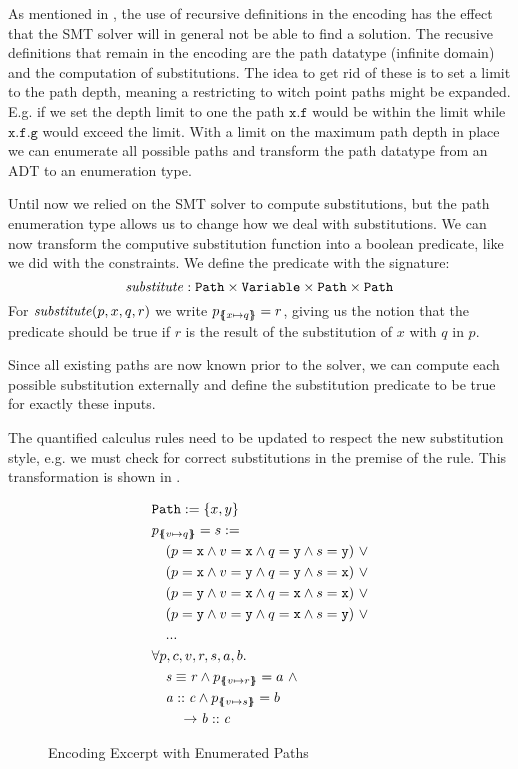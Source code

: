 \documentclass[a4paper]{article}
\begin{document}
As mentioned in , the use of recursive definitions in the encoding has
the effect that the SMT solver will in general not be able to find a solution.
The recusive definitions that remain in the encoding are the path datatype (infinite domain)
and the computation of substitutions.
The idea to get rid of these is to set a limit to the path depth,
meaning a restricting to witch point paths might be expanded.
E.g. if we set the depth limit to one the path $\mathtt{x.f}$ would be within the limit while
$\mathtt{x.f.g}$ would exceed the limit.
With a limit on the maximum path depth in place we can enumerate all possible paths
and transform the path datatype from an ADT to an enumeration type.

Until now we relied on the SMT solver to compute substitutions, but
the path enumeration type allows us to change how we deal with substitutions.
We can now transform the computive substitution function into a boolean predicate,
like we did with the constraints.
We define the predicate with the signature:
\[ \mathit{substitute}: \mathtt{Path} \times \mathtt{Variable} \times \mathtt{Path} \times \mathtt{Path} \]
For $\mathit{substitute}(p, x, q, r)$ we write $p_{\{\mskip-6.9mu\{ x \mapsto q \}\mskip-6.9mu\}}=r$,
giving us the notion that the predicate should be true if $r$ is the result
of the substitution of $x$ with $q$ in $p$.

Since all existing paths are now known prior to the solver,
we can compute each possible substitution externally and define the substitution predicate
to be true for exactly these inputs.

The quantified calculus rules need to be updated to respect the new substitution style,
e.g. we must check for correct substitutions in the premise of the rule.
This transformation is shown in .

\begin{figure}[ht]
  \begin{align*}
    &\Path := \{ x, y \}\\
    &\subst{p}{v}{q} = s :=\\
    &\quad (p=\mathtt{x} \land v=\mathtt{x} \land q=\mathtt{y} \land s=\mathtt{y})~\lor\\
    &\quad (p=\mathtt{x} \land v=\mathtt{y} \land q=\mathtt{y} \land s=\mathtt{x})~\lor\\
    &\quad (p=\mathtt{y} \land v=\mathtt{x} \land q=\mathtt{x} \land s=\mathtt{x})~\lor\\
    &\quad (p=\mathtt{y} \land v=\mathtt{y} \land q=\mathtt{x} \land s=\mathtt{y})~\lor\\
    &\quad ...\\
    &\forall p, c, v, r, s, a, b.\\
    &\quad \pathEq{s}{r} \land \subst{p}{v}{r}=a~\land\\
    &\quad \instOf{a}{c} \land
          \subst{p}{v}{s}=b\\
    &\qquad \rightarrow \instOf{b}{c}
  \end{align*}
  \caption{Encoding Excerpt with Enumerated Paths}
  \label{fig:path-depth-limit-encoding-excerpt}
\end{figure}
\end{document}
